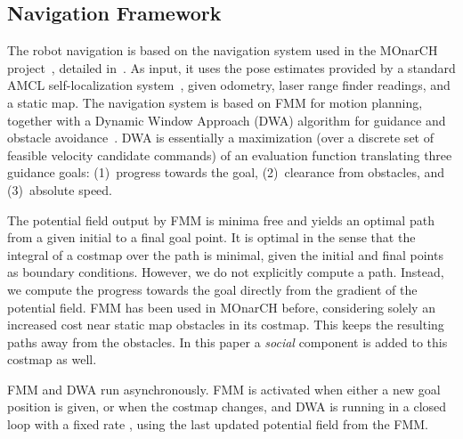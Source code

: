 \subsection{Navigation Framework}

The robot navigation is based on the navigation system used in the MOnarCH project~\cite{monarch2013}, detailed in~\cite{ventura2015}. As input, it uses the pose estimates provided by a standard AMCL self-localization system~\cite{amcl}, given odometry, laser range finder readings, and a static map. The navigation system is based on FMM for motion planning, together with a Dynamic Window Approach (DWA) algorithm for guidance and obstacle avoidance~\cite{fox1997dynamic}. DWA is essentially a maximization (over a discrete set of feasible velocity candidate commands) of an evaluation function translating three guidance goals: (1)~progress towards the goal, (2)~clearance from obstacles, and (3)~absolute speed.

The potential field output by FMM is minima free and yields an optimal path from a given initial to a final goal point. It is optimal in the sense that the integral of a costmap over the path is minimal, given the initial and final points as boundary conditions.
However, we do not explicitly compute a path. Instead, we compute the progress towards the goal directly from the gradient of the potential field. FMM has been used in MOnarCH before, considering solely an increased cost near static map obstacles in its costmap. This keeps the resulting paths away from the obstacles. In this paper a \emph{social} component is added to this costmap as well.%

FMM and DWA run asynchronously. FMM is activated when either a new goal position is given, or when the costmap changes, and DWA is running in a closed loop with a fixed rate%
, using the last updated potential field from the FMM.


